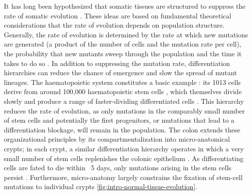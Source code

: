 It has long been hypothesized that somatic tissues are structured to suppress the rate of somatic evolution \parencite{Cairns1975-oz}. These ideas are based on fundamental theoretical considerations that the rate of evolution depends on population structure. Generally, the rate of evolution is determined by the rate at which new mutations are generated (a product of the number of cells and the mutation rate per cell), the probability that new mutants sweep through the population \parencite{Lieberman2005-cy} and the time it takes to do so \parencite{Frean2013-rq,Tkadlec2019-cp}. In addition to suppressing the mutation rate, differentiation hierarchies can reduce the chance of emergence and slow the spread of mutant lineages. The haematopoietic system constitutes a basic example \parencite{Lopes2007-je}: its 1013 cells derive from around 100,000 haematopoietic stem cells \parencite{Lee-Six2018-pn,Sender2016-og}, which themselves divide slowly and produce a range of faster-dividing differentiated cells \parencite{Humphries2008-jj}. This hierarchy reduces the rate of evolution, as only mutations in the comparably small number of stem cells and potentially the first progenitors, or mutations that lead to a differentiation blockage, will remain in the population. The colon extends these organizational principles by its compartmentalization into micro-anatomical crypts; in each crypt, a similar differentiation hierarchy operates in which a very small number of stem cells replenishes the colonic epithelium \parencite{Humphries2008-jj}. As differentiating cells are fated to die within ~5 days, only mutations arising in the stem cells persist \parencite{Cairns1975-oz,Nowak2003-pq,Sender2021-ow}. Furthermore, micro-anatomy largely constrains the fixation of stem-cell mutations to individual crypts \cref{fig:intro-normal-tissue-evolution}.

